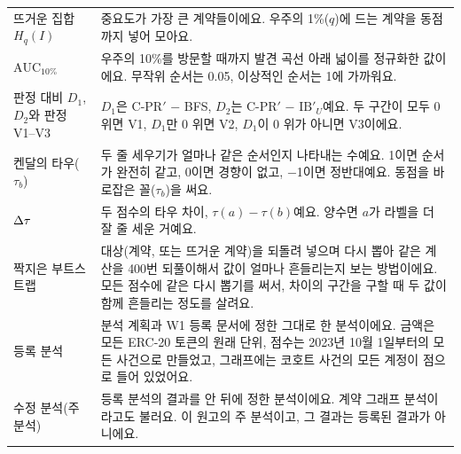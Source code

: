\documentclass[11pt]{article}
\newcommand{\IB}{\mathrm{IB}}
\newcommand{\AUC}{\mathrm{AUC}}
\begin{document}
{\begin{longtable}{@{}L{3.6cm}L{11.9cm}@{}}
뜨거운 집합 $H_q(I)$ & 중요도가 가장 큰 계약들이에요. 우주의 1\%($q$)에 드는 계약을 동점까지 넣어 모아요. \\
$\AUC_{10\%}$ & 우주의 10\%를 방문할 때까지 발견 곡선 아래 넓이를 정규화한 값이에요. 무작위 순서는 0.05, 이상적인 순서는 1에 가까워요. \\
판정 대비 $D_1$, $D_2$와 판정 V1–V3 & $D_1$은 C-PR$'$ − BFS, $D_2$는 C-PR$'$ − $\IB'_U$예요. 두 구간이 모두 0 위면 V1, $D_1$만 0 위면 V2, $D_1$이 0 위가 아니면 V3이에요. \\
켄달의 타우($\tau_b$) & 두 줄 세우기가 얼마나 같은 순서인지 나타내는 수예요. 1이면 순서가 완전히 같고, 0이면 경향이 없고, −1이면 정반대예요. 동점을 바로잡은 꼴($\tau_b$)을 써요. \\
$\Delta\tau$ & 두 점수의 타우 차이, $\tau(a)-\tau(b)$예요. 양수면 $a$가 라벨을 더 잘 줄 세운 거예요. \\
짝지은 부트스트랩 & 대상(계약, 또는 뜨거운 계약)을 되돌려 넣으며 다시 뽑아 같은 계산을 400번 되풀이해서 값이 얼마나 흔들리는지 보는 방법이에요. 모든 점수에 같은 다시 뽑기를 써서, 차이의 구간을 구할 때 두 값이 함께 흔들리는 정도를 살려요. \\
등록 분석 & 분석 계획과 W1 등록 문서에 정한 그대로 한 분석이에요. 금액은 모든 ERC-20 토큰의 원래 단위, 점수는 2023년 10월 1일부터의 모든 사건으로 만들었고, 그래프에는 코호트 사건의 모든 계정이 점으로 들어 있었어요. \\
수정 분석(주 분석) & 등록 분석의 결과를 안 뒤에 정한 분석이에요. 계약 그래프 분석이라고도 불러요. 이 원고의 주 분석이고, 그 결과는 등록된 결과가 아니에요. \\
\bottomrule
\end{longtable}}
\addtocounter{table}{-1}%









\end{document}

